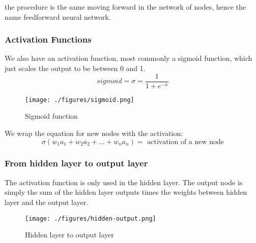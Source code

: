 the procedure is the same moving forward in the network of nodes, hence the name feedforward neural network.


\subsubsection{Activation Functions}
We also have an activation function, most commonly a sigmoid function, which just scales the output to be between 0 and 1. 
$$
	sigmoid = \sigma = \frac{1}{1+e^{-x}}
$$

\begin{figure}[h]
	\centering
	\texttt{[image: ./figures/sigmoid.png]}
	\caption{Sigmoid function}
\end{figure}

We wrap the equation for new nodes with the activation:
$$
	\sigma(w_1a_1+w_2a_2+...+w_na_n) = \text{ activation of a new node}
$$

\subsubsection{From hidden layer to output layer}
The activation function is only used in the hidden layer. The output node is simply the sum of the hidden layer outputs times the weights between hidden layer and the output layer.
\begin{figure}[h]
	\centering
	\texttt{[image: ./figures/hidden-output.png]}
	
	\caption{Hidden layer to output layer}
\end{figure}

